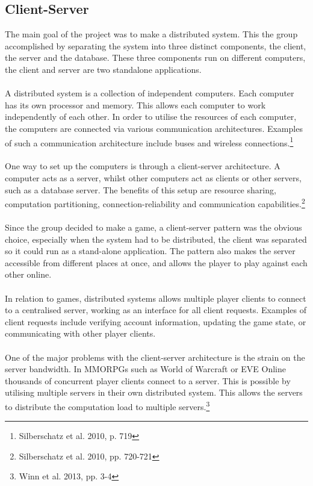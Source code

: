 \subsection{Client-Server}
The main goal of the project was to make a distributed system. This the group
accomplished by separating the system into three distinct components, the
client, the server and the database. These three components run on different
 computers, the client and server are two standalone applications.
\\
\\
A distributed system is a collection of independent computers. Each computer
has its own processor and memory. This allows each computer to work
independently of each other. In order to utilise the resources of each
computer, the computers are connected via various communication architectures.
 Examples of such a communication architecture include buses and wireless
  connections.\footnote{Silberschatz et al. 2010, p. 719}
\\
\\
One way to set up the computers is through a client-server architecture. A
computer acts as a server, whilst other computers act as clients or other
servers, such as a database server. The benefits of this setup are resource
sharing, computation partitioning, connection-reliability and communication
capabilities.\footnote{Silberschatz et al. 2010, pp. 720-721}
\\
\\
Since the group decided to make a game, a client-server pattern was the
obvious choice, especially when the system had to be distributed, the client
was separated so it could run as a stand-alone application. The pattern also
makes the server accessible from different places at once, and allows the
player to play against each other online.
\\
\\
In relation to games, distributed systems allows multiple player clients to
connect to a centralised server, working as an interface for all client
requests. Examples of client requests include verifying account information,
updating the game state, or communicating with other player clients.
\\
\\
One of the major problems with the client-server architecture is the strain
on the server bandwidth. In MMORPGs such as World of Warcraft or EVE Online
thousands of concurrent player clients connect to a server. This is possible
by utilising multiple servers in their own distributed system. This allows
the servers to distribute the computation load to multiple
servers.\footnote{Winn et al. 2013, pp. 3-4}
\\
